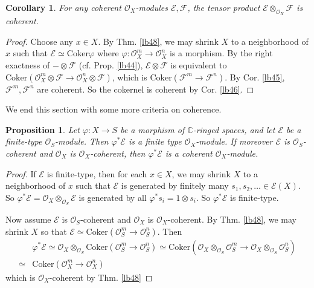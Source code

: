 \documentclass[12pt,b5paper,notitlepage]{report}
\theoremstyle{definition}
\theoremstyle{plain}
\newtheorem{pp}[df]{Proposition}
\newtheorem{co}[df]{Corollary}
\newcommand{\scr}{\mathscr}
\newcommand{\Cbb}{\mathbb C}
\newcommand{\Cok}{\mathrm{Coker}}
\numberwithin{equation}{section}
\begin{document}
\begin{co}
For any coherent $\scr O_X$-modules $\scr E,\scr F$, the tensor product $\scr E\otimes_{\scr O_X}\scr F$ is coherent.
\end{co}

\begin{proof}
Choose any $x\in X$. By Thm. \ref{lb48}, we may shrink $X$ to a neighborhood of $x$ such that $\scr E\simeq\Cok\varphi$ where $\varphi:\scr O_X^m\rightarrow\scr O_X^n$ is a morphism. By the right exactness of $-\otimes\scr F$ (cf. Prop. \ref{lb44}), $\scr E\otimes\scr F$ is equivalent to $\Cok (\scr O_X^m\otimes\scr F\rightarrow\scr O_X^n\otimes\scr F)$, which is $\Cok(\scr F^m\rightarrow\scr F^n)$. By Cor. \ref{lb45}, $\scr F^m,\scr F^n$ are coherent. So the cokernel is coherent by Cor. \ref{lb46}.
\end{proof}




We end this section with some more criteria on coherence.

\begin{pp}\label{lb53}
Let $\varphi:X\rightarrow S$ be a morphism of $\Cbb$-ringed spaces, and let $\scr E$ be a finite-type $\scr O_S$-module. Then $\varphi^*\scr E$ is a finite type $\scr O_X$-module. If moreover $\scr E$ is $\scr O_S$-coherent and $\scr O_X$ is $\scr O_X$-coherent, then $\varphi^*\scr E$ is a coherent $\scr O_X$-module.
\end{pp}

\begin{proof}
If $\scr E$ is finite-type, then for each $x\in X$, we may shrink $X$ to a neighborhood of $x$ such that $\scr E$ is generated by finitely many $s_1,s_2,\dots\in\scr E(X)$. So $\varphi^*\scr E=\scr O_X\otimes_{\scr O_S}\scr E$ is generated by all $\varphi^*s_i=1\otimes s_i$. So $\varphi^*\scr E$ is finite-type.

Now assume $\scr E$ is $\scr O_S$-coherent and $\scr O_X$ is $\scr O_X$-coherent. By Thm. \ref{lb48}, we may shrink $X$ so that $\scr E\simeq\Cok(\scr O_S^m\rightarrow\scr O_S^n)$. Then
\begin{align*}
&\varphi^*\scr E\simeq\scr O_X\otimes_{\scr O_S}\Cok(\scr O_S^m\rightarrow\scr O_S^n)\simeq \Cok(\scr O_X\otimes_{\scr O_S}\scr O_S^m\rightarrow\scr O_X\otimes_{\scr O_S}\scr O_S^n)\\
\simeq&\Cok(\scr O_X^m\rightarrow\scr O_X^n)
\end{align*}
which is $\scr O_X$-coherent by Thm. \ref{lb48}
\end{proof}
\end{document}
